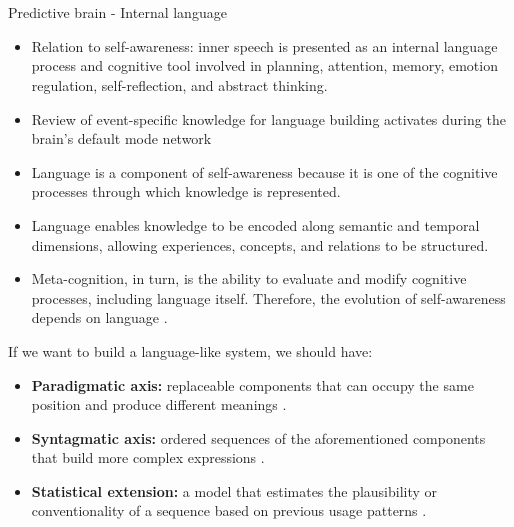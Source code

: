 \section{}
    \begin{frame}[allowframebreaks]{Predictive brain - Internal language}
        \begin{itemize}
            \item Relation to self-awareness: inner speech is presented as an internal language process and cognitive tool involved in planning, attention, memory, emotion regulation, self-reflection, and abstract thinking.
            \item Review of event-specific knowledge for language building activates during the brain's default mode network \cite{menon-2023-20-years-of-the-default-mode-network-a-review-and-synthesis, molnar-szakacs-2013-self-processing-and-the-default-mode-network-interactions-with-the-mirror-neuron-system}
            \item Language is a component of self-awareness because it is one of the cognitive processes through which knowledge is represented.
            \item Language enables knowledge to be encoded along semantic and temporal dimensions, allowing experiences, concepts, and relations to be structured.
            \item Meta-cognition, in turn, is the ability to evaluate and modify cognitive processes, including language itself. Therefore, the evolution of self-awareness depends on language \cite{fernyhough-2023-inner-speech-as-language-process-and-cognitive-tool}.
        \end{itemize}

        If we want to build a language-like system, we should have:
        \begin{itemize}
            \item \textbf{Paradigmatic axis:} replaceable components that can occupy the same position and produce different meanings \cite{saussure-1966-course-in-general-linguistics}.
            \item \textbf{Syntagmatic axis:} ordered sequences of the aforementioned components that build more complex expressions \cite{saussure-1966-course-in-general-linguistics}.
            \item \textbf{Statistical extension:} a model that estimates the plausibility or conventionality of a sequence based on previous usage patterns \cite{mickus-2024-language-models-and-the-paradigmatic-axis}.
        \end{itemize}


\end{frame}
